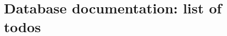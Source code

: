 \documentclass[a4paper,twoside,10pt]{book}
\begin{document}


\begin{appendices}
\end{appendices}

\backmatter

\renewcommand{\chaptermark}[1] {
  \markboth{#1}{}
}

\renewcommand{\chaptermark}[1]{%
  \markboth{\chaptername
    \ \thechapter.\ #1}{}}


\cleardoublepage
\section*{Database documentation: list of todos}
\end{document}
